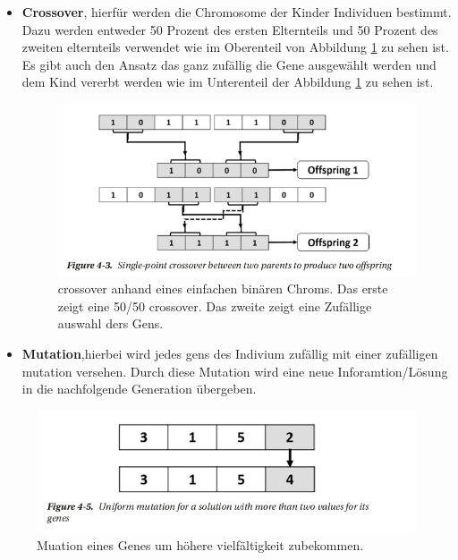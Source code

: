 \begin{itemize}
\item \textbf{Crossover}, hierfür werden die Chromosome der Kinder Individuen bestimmt. Dazu werden entweder 50 Prozent des ersten Elternteils und 50 Prozent des zweiten elternteils verwendet wie im Oberenteil von Abbildung \ref{fig:chromoson crossover} zu sehen ist. Es gibt auch den Ansatz das ganz zufällig die Gene ausgewählt werden und dem Kind vererbt werden wie im Unterenteil der Abbildung \ref{fig:chromoson crossover} zu sehen ist. 

\begin{figure}[H]
  \centering  
  \includegraphics[scale=0.5]{img/crossover.png}
  \caption{crossover anhand eines einfachen binären Chroms. Das erste zeigt eine 50/50 crossover. Das zweite zeigt eine Zufällige auswahl ders Gens.\cite{Rashid2017} }
  \label{fig:chromoson crossover}
\end{figure}

\item \textbf{Mutation},hierbei wird jedes gens des Indivium zufällig mit einer zufälligen mutation versehen. Durch diese Mutation wird eine neue Inforamtion/Lösung in die nachfolgende Generation übergeben. 

\end{itemize}

\begin{figure}[H]
  \centering  
  \includegraphics[scale=0.5]{img/mutation.png}
  \caption{Muation eines Genes um höhere vielfältigkeit zubekommen.\cite{Rashid2017} }
  \label{fig:chromoson mutation}
\end{figure}


